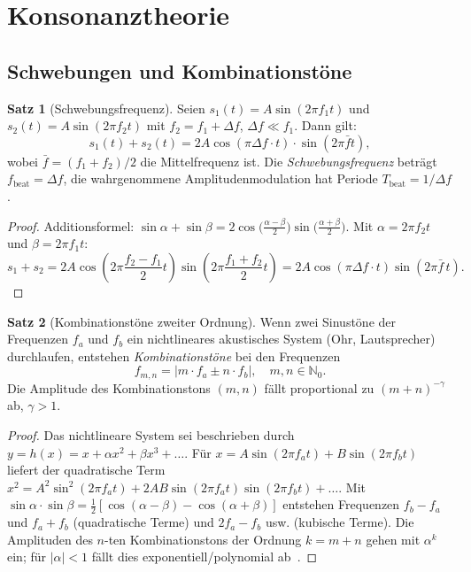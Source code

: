 ﻿\documentclass[a4paper,12pt]{article}
\theoremstyle{definition}
\newtheorem{satz}{Satz}
\begin{document}
\section{Konsonanztheorie}

\subsection{Schwebungen und Kombinationstöne}

\begin{satz}[Schwebungsfrequenz]
\label{satz:schwebung}
Seien $s_1(t) = A\sin(2\pi f_1 t)$ und $s_2(t) = A\sin(2\pi f_2 t)$ mit
$f_2 = f_1 + \Delta f$, $\Delta f \ll f_1$. Dann gilt:
\[
s_1(t) + s_2(t) = 2A\cos\!\left(\pi \Delta f \cdot t\right) \cdot
\sin\!\left(2\pi \bar{f} t\right),
\]
wobei $\bar{f} = (f_1 + f_2)/2$ die Mittelfrequenz ist.
Die \emph{Schwebungsfrequenz} beträgt $f_{\mathrm{beat}} = \Delta f$, die
wahrgenommene Amplitudenmodulation hat Periode $T_{\mathrm{beat}} = 1/\Delta f$.
\end{satz}

\begin{proof}
Additionsformel: $\sin \alpha + \sin \beta = 2\cos\bigl(\frac{\alpha-\beta}{2}\bigr)
\sin\bigl(\frac{\alpha+\beta}{2}\bigr)$.
Mit $\alpha = 2\pi f_2 t$ und $\beta = 2\pi f_1 t$:
\[
s_1+s_2 = 2A\cos\!\left(2\pi \frac{f_2-f_1}{2} t\right)
            \sin\!\left(2\pi \frac{f_1+f_2}{2} t\right)
= 2A\cos(\pi\Delta f\cdot t)\sin(2\pi\bar{f}\,t).
\]
\end{proof}

\begin{satz}[Kombinationstöne zweiter Ordnung]
\label{satz:kombi}
Wenn zwei Sinustöne der Frequenzen $f_a$ und $f_b$ ein nichtlineares
akustisches System (Ohr, Lautsprecher) durchlaufen, entstehen
\emph{Kombinationstöne} bei den Frequenzen
\[
f_{m,n} = |m \cdot f_a \pm n \cdot f_b|, \quad m, n \in \mathbb{N}_0.
\]
Die Amplitude des Kombinationstons $(m,n)$ fällt proportional zu
$(m+n)^{-\gamma}$ ab, $\gamma > 1$.
\end{satz}

\begin{proof}
Das nichtlineare System sei beschrieben durch $y = h(x) = x + \alpha x^2 + \beta x^3 + \ldots$.
Für $x = A\sin(2\pi f_a t) + B\sin(2\pi f_b t)$ liefert der quadratische Term
$x^2 = A^2\sin^2(2\pi f_a t) + 2AB\sin(2\pi f_a t)\sin(2\pi f_b t) + \ldots$.
Mit $\sin\alpha\cdot\sin\beta = \frac{1}{2}[\cos(\alpha-\beta) - \cos(\alpha+\beta)]$
entstehen Frequenzen $f_b - f_a$ und $f_a + f_b$ (quadratische Terme) und
$2f_a - f_b$ usw. (kubische Terme). Die Amplituden des $n$-ten Kombinationstons
der Ordnung $k = m+n$ gehen mit $\alpha^k$ ein; für $|\alpha| < 1$ fällt dies
exponentiell/polynomial ab~\cite{roederer2008}.
\end{proof}
\end{document}
